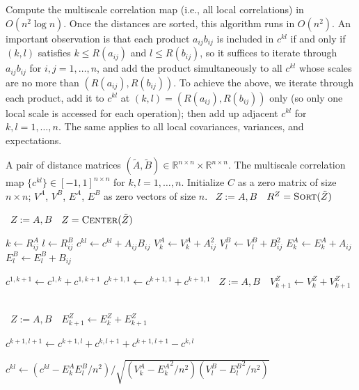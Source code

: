 \documentclass[11pt]{article}
\newcommand{\Real}{\mathbb{R}}
\newcommand{\GG}{c}
\newcommand{\Linefor}[2]{%
    \State \algorithmicfor\ {#1}\ \algorithmicdo\ {#2} \algorithmicend\ \algorithmicfor%
}
\newcommand{\rto}{\leftarrow}
\begin{document}
\begin{algorithm}
\caption{Compute the multiscale correlation map (i.e., all local correlations) in $O(n^2 \log n)$. Once the distances are sorted, this algorithm runs in $O(n^2)$. An important observation is that each product $a_{ij}b_{ij}$ is included in $\GG^{kl}$ if and only if $(k,l)$ satisfies $k\leq R(a_{ij})$ and $l\leq R(b_{ij})$, so it suffices to iterate through $a_{ij}b_{ij}$ for $i,j=1,\ldots,n$, and add the product simultaneously to all $\GG^{kl}$ whose scales are no more than $(R(a_{ij}),R(b_{ij}))$. To achieve the above, we iterate through each product, add it to $\GG^{kl}$ at $(k,l)=(R(a_{ij}),R(b_{ij}))$ only (so only one local scale is accessed for each operation); then add up adjacent $\GG^{kl}$ for $k,l=1,\ldots,n$. The same applies to all local covariances, variances, and expectations.} 
\label{alg:all_scales}
\begin{algorithmic}[1]
\Require A pair of distance matrices $(\tilde{A},\tilde{B}) \in \Real^{n \times n} \times \Real^{n \times n}$.
\Ensure The multiscale correlation map $\{\GG^{kl}\} \in [-1,1]^{n \times n}$ for $k,l=1,\ldots,n$.
\State Initialize $C$ as a zero matrix of size $n \times n$; $V^{A}$, $V^{B}$, $E^{A}$, $E^{B}$ as zero vectors of size $n$.
\Linefor{$Z:=A,B$}{$R^{Z}=\textsc{Sort}(\tilde{Z})$}
\Linefor{$Z:=A,B$}{$Z=\textsc{Center}(\tilde{Z})$}

  
\State $k \rto R^{A}_{ij}$
\State $l \rto R^{B}_{ij}$
\State $\GG^{kl} \rto \GG^{kl}+A_{ij}B_{ij}$
\State $V^{A}_{k} \rto V^{A}_{k}+A_{ij}^2$
\State $V^{B}_{l} \rto V^{B}_{l}+B_{ij}^2$
\State $E^{A}_{k} \rto E^{A}_{k}+A_{ij}$
\State $E^{B}_{l} \rto E^{B}_{l}+B_{ij}$
\EndFor

  
\State $\GG^{1, k+1} \rto \GG^{1, k}+\GG^{1, k+1}$
\State $\GG^{k+1,1} \rto \GG^{k+1,1}+\GG^{k+1,1}$
\Linefor{$Z:=A,B$}{$V^{Z}_{k+1} \rto V^{Z}_{k}+V^{Z}_{k+1}$}
\Linefor{$Z:=A,B$}{$E^{Z}_{k+1} \rto E^{Z}_{k}+E^{Z}_{k+1}$}
\EndFor

\State $\GG^{k+1,l+1} \rto \GG^{k+1,l}+\GG^{k,l+1}+\GG^{k+1,l+1}-\GG^{k,l}$
\EndFor

\State $\GG^{kl} \rto \left(\GG^{kl}-E^{A}_{k}E^{B}_{l}/n^2\right)/\sqrt{\left(V^{A}_{k}-{E^{A}_{k}}^2/n^2\right) \left(V^{B}_{l}-{E^{B}_{l}}^2/n^2\right)}$
\EndFor
\EndFunction
\end{algorithmic}
\end{algorithm}
\end{document}

